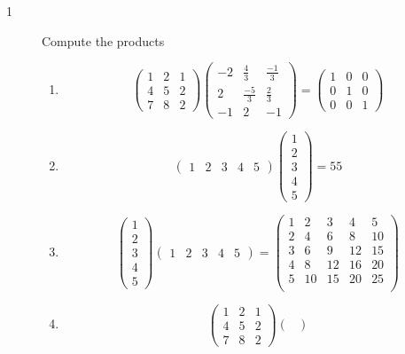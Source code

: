 \documentclass[letterpaper,10pt]{article}
\begin{document}
\begin{description}
\item[1] Compute the products\\
\begin{enumerate}[label=\alph*.]
\item
\[\begin{pmatrix}
1 & 2 & 1\\
4 & 5 & 2\\
7 & 8 & 2
\end{pmatrix}\begin{pmatrix}
-2 & \frac{4}{3} & \frac{-1}{3}\\
2 & \frac{-5}{3} & \frac{2}{3}\\
-1 & 2 &-1
\end{pmatrix}=\begin{pmatrix}
1 & 0 & 0\\
0 & 1 & 0\\
0 & 0 & 1
\end{pmatrix}
\]
\item
\[\begin{pmatrix}
1 & 2 & 3 & 4 & 5
\end{pmatrix}
\begin{pmatrix}
1 \\
2 \\
3 \\
4 \\
5
\end{pmatrix}=55
\]
\item
\[\begin{pmatrix}
1 \\
2 \\
3 \\
4 \\
5
\end{pmatrix}
\begin{pmatrix}
1 & 2 & 3 & 4 & 5
\end{pmatrix}=\begin{pmatrix}
1 & 2 & 3 & 4 & 5\\
2 & 4 & 6 & 8 & 10\\
3 & 6 & 9 & 12 & 15\\
4 & 8 & 12 & 16 & 20\\
5 & 10 & 15 & 20 & 25\\
\end{pmatrix}
\]
\item
\[\begin{pmatrix}
1 & 2 & 1\\
4 & 5 & 2\\
7 & 8 & 2
\end{pmatrix}\begin{pmatrix}

\end{pmatrix}\]
\end{enumerate}
\end{description}
\end{document}
